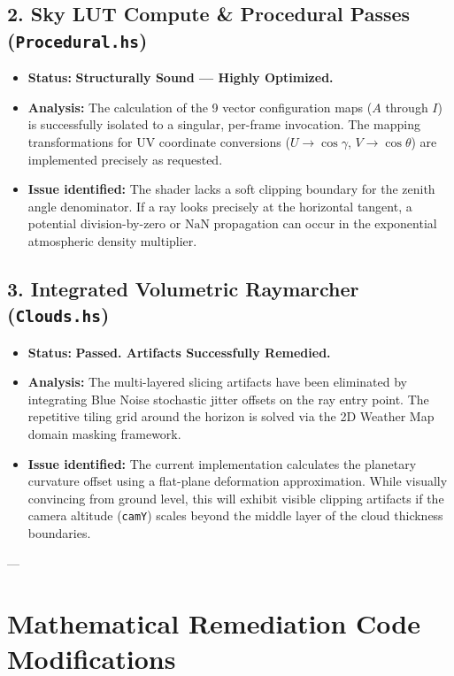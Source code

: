 \documentclass[11pt,a4paper]{article}
\begin{document}
\subsection{2. Sky LUT Compute \& Procedural Passes (\texttt{Procedural.hs})}
\begin{itemize}
    \item \textbf{Status:} \textbf{Structurally Sound --- Highly Optimized.}
    \item \textbf{Analysis:} The calculation of the 9 vector configuration maps ($A$ through $I$) is successfully isolated to a singular, per-frame invocation. The mapping transformations for UV coordinate conversions ($U \to \cos\gamma$, $V \to \cos\theta$) are implemented precisely as requested.
    \item \textbf{Issue identified:} The shader lacks a soft clipping boundary for the zenith angle denominator. If a ray looks precisely at the horizontal tangent, a potential division-by-zero or $\text{NaN}$ propagation can occur in the exponential atmospheric density multiplier.
\end{itemize}

\subsection{3. Integrated Volumetric Raymarcher (\texttt{Clouds.hs})}
\begin{itemize}
    \item \textbf{Status:} \textbf{Passed. Artifacts Successfully Remedied.}
    \item \textbf{Analysis:} The multi-layered slicing artifacts have been eliminated by integrating Blue Noise stochastic jitter offsets on the ray entry point. The repetitive tiling grid around the horizon is solved via the 2D Weather Map domain masking framework. 
    \item \textbf{Issue identified:} The current implementation calculates the planetary curvature offset using a flat-plane deformation approximation. While visually convincing from ground level, this will exhibit visible clipping artifacts if the camera altitude (\texttt{camY}) scales beyond the middle layer of the cloud thickness boundaries.
\end{itemize}

---

\section{Mathematical Remediation Code Modifications}
\end{document}
